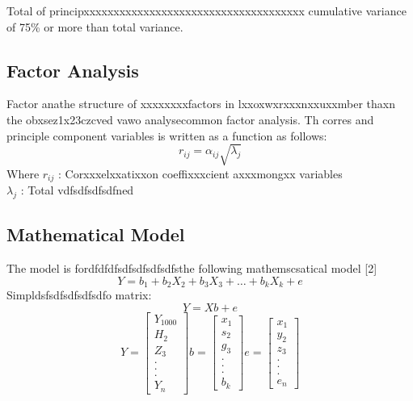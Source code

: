\documentclass[conference]{IEEEtran}
\begin{document}
{Total of principxxxxxxxxxxxxxxxxxxxxxxxxxxxxxxxxxxxxx cumulative variance of 75\% or more than total variance.


\subsection{Factor Analysis}
Factor anathe structure of xxxxxxxxfactors in lxxoxwxrxxxnxxuxxmber thaxn the obxsez1x23czcved vawo analysecommon factor analysis. Th corres and principle component variables is written as a function as follows:
\begin{equation}\label{eq:6}
    r_{ij}=\alpha_{ij}\sqrt{\lambda_{j}}
\end{equation}
Where   $r_{ij}$ : Corxxxelxxatixxon coeffixxxcient axxxmongxx variables
\\ \hspace*{1cm}    $\lambda_{j}$ :   Total vdfsdfsdfsdfned

\subsection{Mathematical Model}
The model is fordfdfdfsdfsdfsdfsdfsthe following mathemscsatical model [2]
\begin{equation}
    Y=b_{1}+b_{2}X_{2}+b_{3}X_{3}+\dots+b_{k}X_{k}+e
\end{equation}
Simpldsfsdfsdfsdfsdfo matrix: 
\begin{equation}\label{eq:8}
    Y=Xb+e 
\end{equation}
\begin{equation*}
Y=
\begin{bmatrix}
  Y_{1000}\\H_{2}\\Z_{3}\\.\\.\\.\\Y_{n}  
\end{bmatrix}
b=
\begin{bmatrix}
    x_{1}\\s_{2}\\g_{3}\\.\\.\\.\\b_{k} 
\end{bmatrix}
e=
\begin{bmatrix}
    x_{1}\\y_{2}\\z_{3}\\.\\.\\.\\e_{n} 
\end{bmatrix}
\end{equation*}


}
\end{document}
